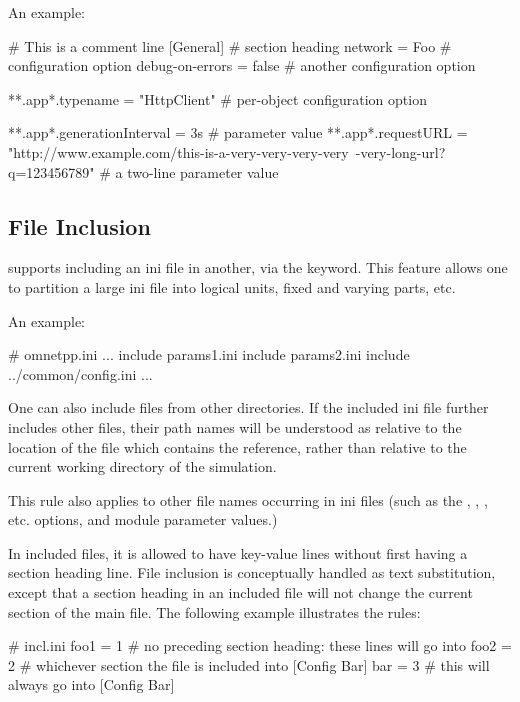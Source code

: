An example:

\begin{inifile}
# This is a comment line
[General]                       # section heading
network = Foo                   # configuration option
debug-on-errors = false         # another configuration option

**.app*.typename = "HttpClient" # per-object configuration option

**.app*.generationInterval = 3s # parameter value
**.app*.requestURL = "http://www.example.com/this-is-a-very-very-very-very\
-very-long-url?q=123456789"     # a two-line parameter value
\end{inifile}

\subsection{File Inclusion}
\label{sec:config-sim:inifile-inclusion}

{\opp} supports including an ini file in another,
via the \ttt{include} keyword. This feature allows one to partition a large ini
file into logical units, fixed and varying parts, etc.

An example:

\begin{inifile}
# omnetpp.ini
...
include params1.ini
include params2.ini
include ../common/config.ini
...
\end{inifile}

One can also include files from other directories. If the included ini file
further includes other files, their path names will be understood as relative to
the location of the file which contains the reference, rather than relative
to the current working directory of the simulation.

This rule also applies to other file names occurring in ini files (such as
the \fconfig{load-libs}, \fconfig{output-vector-file},
, etc. options, and  module
parameter values.)

In included files, it is allowed to have key-value lines without first having a
section heading line. File inclusion is conceptually handled as text
substitution, except that a section heading in an included file will not
change the current section of the main file. The following example illustrates
the rules:

\begin{inifile}
# incl.ini
foo1 = 1          # no preceding section heading: these lines will go into
foo2 = 2          # whichever section the file is included into
[Config Bar]
bar = 3           # this will always go into [Config Bar]
\end{inifile}

